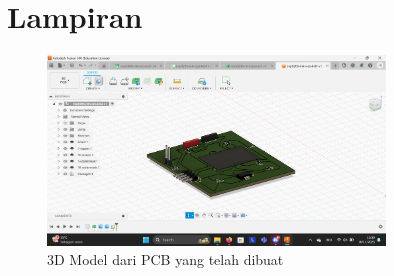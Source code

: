 \section*{Lampiran} %

\begin{figure}[htbp]
    \centering
    \includegraphics[width=0.8\textwidth]{img/fusion360.png}
    \caption{3D Model dari PCB yang telah dibuat}
    \label{fig:3dmodel}
\end{figure}

